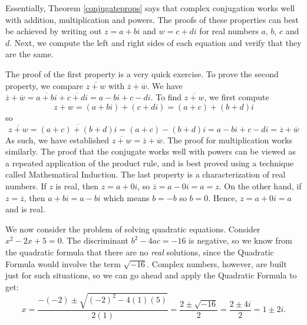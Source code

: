 \medskip

Essentially, Theorem \ref{conjugateprops} says that complex conjugation works well with addition, multiplication and powers.  The proofs of these properties can best be achieved by writing out $z = a+bi$ and $w = c+di$ for real numbers $a$, $b$, $c$ and $d$.   Next, we compute the left and right sides of each equation and verify that they are the same.  

\smallskip

The proof of the first property is a very quick exercise.  To prove the second property, we compare $\overline{z+w}$ with $\overline{z} + \overline{w}$.  We have $\overline{z} + \overline{w} = \overline{a+bi} + \overline{c+di}  = a-bi + c-di$.  To find $\overline{z+w}$, we first compute \[z+w = (a+bi) + (c+di) = (a+c)+(b+d)i\] so \[\overline{z+w} = \overline{(a+c)+(b+d)i} = (a+c) - (b+d)i = a - bi + c - di = \overline{z} + \overline{w}\]  As such, we have established  $\overline{z+w} = \overline{z}+\overline{w}$. The proof for multiplication works similarly.  The proof that the conjugate works well with powers can be viewed as a repeated application of the product rule, and is best proved using a technique called Mathematical Induction.  The last property is a characterization of real numbers.  If $z$ is real, then $z = a + 0i$, so $\overline{z} = a - 0i = a = z$.  On the other hand, if $z=\overline{z}$, then $a+bi = a - bi$ which means $b=-b$ so $b=0$.  Hence, $z = a +0i = a$ and is real.



\medskip

We now consider the problem of solving quadratic equations. Consider  $x^2-2x+5 = 0$. The discriminant $b^2 - 4ac = -16$ is negative, so we know from the quadratic formula that there are no \textit{real} solutions, since the Quadratic Formula would involve the term $\sqrt{-16}$.  Complex numbers, however, are built just for such situations, so we can go ahead and apply the Quadratic Formula to get:
 \[
  x = \dfrac{-(-2) \pm \sqrt{(-2)^2-4(1)(5)}}{2(1)} = \dfrac{2 \pm \sqrt{-16}}{2} = \dfrac{2 \pm 4i}{2} = 1 \pm 2i.
\]  

